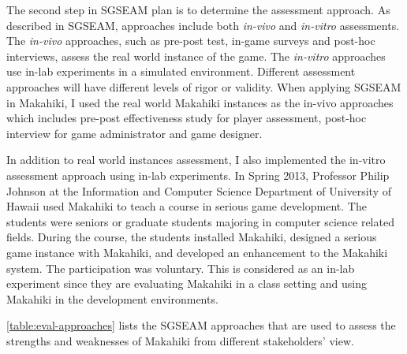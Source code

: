 The second step in SGSEAM plan is to determine the assessment approach. As described in SGSEAM, approaches include both  {\em in-vivo} and {\em in-vitro} assessments. The  {\em in-vivo} approaches, such as pre-post test, in-game surveys and post-hoc interviews, assess the real world instance of the game. The {\em in-vitro} approaches use in-lab experiments in a simulated environment. Different assessment approaches will have different levels of rigor or validity. When applying SGSEAM in Makahiki, I used the real world Makahiki instances as the in-vivo approaches which includes pre-post effectiveness study for player assessment, post-hoc interview for game administrator and game designer. 

In addition to real world instances assessment, I also implemented the in-vitro assessment approach using in-lab experiments. In Spring 2013, Professor Philip Johnson at the Information and Computer Science Department of University of Hawaii used Makahiki to teach a course in serious game development. The students were seniors or graduate students majoring in computer science related fields. During the course, the students installed Makahiki, designed a serious game instance with Makahiki, and developed an enhancement to the Makahiki system.
The participation was voluntary. This is considered as an in-lab experiment since they are evaluating Makahiki in a class setting and using Makahiki in the development environments.

\autoref{table:eval-approaches} lists the SGSEAM approaches that are used to assess the strengths and weaknesses of Makahiki from different stakeholders' view.

